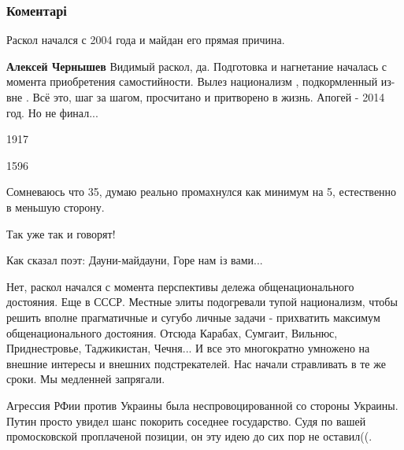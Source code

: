  
 
 
 
 
\subsubsection{Коментарі}
\label{sec:23_11_2020.fb.kosarenko_stas.zaporozhie.1.maidan.cmt}

\begin{itemize} %
Раскол начался с 2004 года и майдан его прямая причина.

\begin{itemize} %
\textbf{Алексей Чернышев} Видимый раскол, да. Подготовка и нагнетание началась с момента приобретения самостийности. Вылез национализм , подкормленный из-вне . Всё это, шаг за шагом, просчитано и притворено в жизнь. Апогей - 2014 год. Но не финал...
\end{itemize} %

1917

1596

Сомневаюсь что 35, думаю реально промахнулся как минимум на 5, естественно в меньшую сторону.

Так уже так и говорят!

Как сказал поэт:
Дауни-майдауни,
Горе нам із вами...


Нет, раскол начался с момента перспективы дележа общенационального достояния.
Еще в СССР. Местные элиты подогревали тупой национализм, чтобы решить вполне
прагматичные и сугубо личные задачи - прихватить максимум общенационального
достояния. Отсюда Карабах, Сумгаит, Вильнюс, Приднестровье, Таджикистан,
Чечня... И все это многократно умножено на внешние интересы и внешних
подстрекателей. Нас начали стравливать в те же сроки. Мы медленней запрягали.



Агрессия РФии против Украины была неспровоцированной со стороны Украины. Путин
просто увидел шанс покорить соседнее государство. Судя по вашей промосковской
проплаченой позиции, он эту идею до сих пор не оставил((.


\end{itemize}

